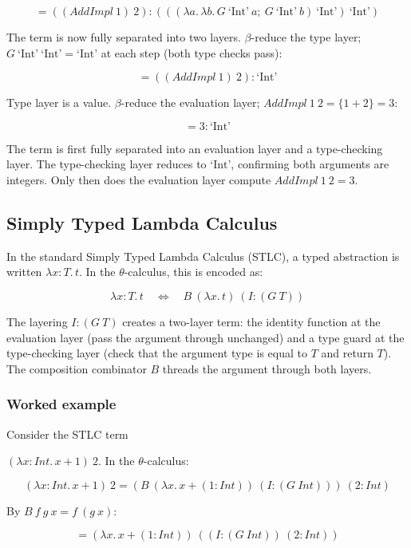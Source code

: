 \documentclass[11pt,letterpaper]{article}
\theoremstyle{definition}
\begin{document}
$$
= ((AddImpl\ 1)\ 2){:}(((\lambda a.\,\lambda b.\, G\ \text{`Int'}\ a;\ G\ \text{`Int'}\ b)\ \text{`Int'})\ \text{`Int'})
$$

The term is now fully separated into two layers. $\beta$-reduce the type layer;
$G\ \text{`Int'}\ \text{`Int'} = \text{`Int'}$ at each step (both type checks pass):

$$
= ((AddImpl\ 1)\ 2){:}\text{`Int'}
$$

Type layer is a value. $\beta$-reduce the evaluation layer;
$AddImpl\ 1\ 2 = \{1 + 2\} = 3$:

$$
= 3{:}\text{`Int'}
$$

The term is first fully separated into an evaluation layer and a type-checking
layer. The type-checking layer reduces to $\text{`Int'}$, confirming both
arguments are integers. Only then does the evaluation layer compute
$AddImpl\ 1\ 2 = 3$.

\subsection{Simply Typed Lambda Calculus}\label{sec:stlc}

In the standard Simply Typed Lambda Calculus (STLC), a typed abstraction is
written $\lambda x{:}T.\, t$. In the $\theta$-calculus, this is encoded as:

$$
\lambda x{:}T.\, t \quad\Longleftrightarrow\quad B\ (\lambda x.\,t)\ (I{:}(G\ T))
$$

The layering $I{:}(G\ T)$ creates a two-layer term: the identity function at
the evaluation layer (pass the argument through unchanged) and a type guard
at the type-checking layer (check that the argument type is equal to $T$ and
return $T$). The composition combinator $B$ threads the argument through both
layers.

\subsubsection*{Worked example}


Consider the STLC term 


$(\lambda x{:}\mathit{Int}.\, x + 1)\ 2$.
In the $\theta$-calculus:

$$
(\lambda x{:}\mathit{Int}.\, x + 1)\ 2
= (B\ (\lambda x.\,x + (1{:}\mathit{Int}))\ (I{:}(G\ \mathit{Int})))
  \ (2{:}\mathit{Int})
$$

By $B\ f\ g\ x = f\ (g\ x)$:

$$
= (\lambda x.\,x + (1{:}\mathit{Int}))
  \ ((I{:}(G\ \mathit{Int}))\ (2{:}\mathit{Int}))
$$
\end{document}

